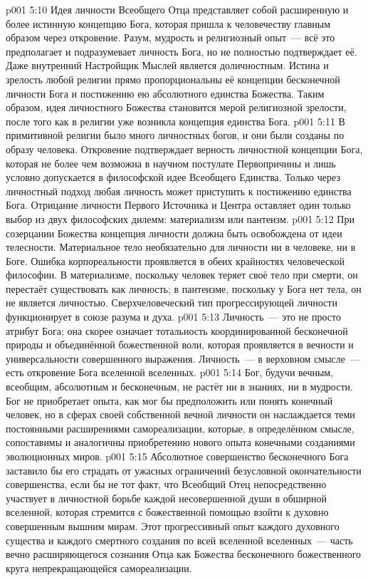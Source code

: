 \vs p001 5:10 \pc Идея личности Всеобщего Отца представляет собой расширенную и более истинную концепцию Бога, которая пришла к человечеству главным образом через откровение. Разум, мудрость и религиозный опыт~--- всё это предполагает и подразумевает личность Бога, но не полностью подтверждает её. Даже внутренний Настройщик Мыслей является доличностным. Истина и зрелость любой религии прямо пропорциональны её концепции бесконечной личности Бога и постижению ею абсолютного единства Божества. Таким образом, идея личностного Божества становится мерой религиозной зрелости, после того как в религии уже возникла концепция единства Бога.
\vs p001 5:11 В примитивной религии было много личностных богов, и они были созданы по образу человека. Откровение подтверждает верность личностной концепции Бога, которая не более чем возможна в научном постулате Первопричины и лишь условно допускается в философской идее Всеобщего Единства. Только через личностный подход любая личность может приступить к постижению единства Бога. Отрицание личности Первого Источника и Центра оставляет один только выбор из двух философских дилемм: материализм или пантеизм.
\vs p001 5:12 При созерцании Божества концепция личности должна быть освобождена от идеи телесности. Материальное тело необязательно для личности ни в человеке, ни в Боге. Ошибка корпореальности проявляется в обеих крайностях человеческой философии. В материализме, поскольку человек теряет своё тело при смерти, он перестаёт существовать как личность; в пантеизме, поскольку у Бога нет тела, он не является личностью. Сверхчеловеческий тип прогрессирующей личности функционирует в союзе разума и духа.
\vs p001 5:13 \pc Личность~--- это не просто атрибут Бога; она скорее означает тотальность координированной бесконечной природы и объединённой божественной воли, которая проявляется в вечности и универсальности совершенного выражения. Личность~--- в верховном смысле~--- есть откровение Бога вселенной вселенных.
\vs p001 5:14 \pc Бог, будучи вечным, всеобщим, абсолютным и бесконечным, не растёт ни в знаниях, ни в мудрости. Бог не приобретает опыта, как мог бы предположить или понять конечный человек, но в сферах своей собственной вечной личности он наслаждается теми постоянными расширениями самореализации, которые, в определённом смысле, сопоставимы и аналогичны приобретению нового опыта конечными созданиями эволюционных миров.
\vs p001 5:15 Абсолютное совершенство бесконечного Бога заставило бы его страдать от ужасных ограничений безусловной окончательности совершенства, если бы не тот факт, что Всеобщий Отец непосредственно участвует в личностной борьбе каждой несовершенной души в обширной вселенной, которая стремится с божественной помощью взойти к духовно совершенным вышним мирам. Этот прогрессивный опыт каждого духовного существа и каждого смертного создания по всей вселенной вселенных~--- часть вечно расширяющегося сознания Отца как Божества бесконечного божественного круга непрекращающейся самореализации.
